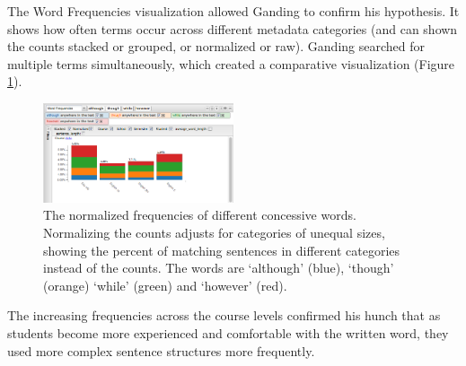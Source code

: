 \documentclass{sig-alternate}
\begin{document}
The Word Frequencies visualization allowed Ganding to confirm his hypothesis. It shows how often terms occur across different metadata categories (and can shown the counts stacked or grouped, or normalized or raw). Ganding searched for multiple terms simultaneously, which created a comparative visualization (Figure \ref{fig:rex05}).

\begin{figure}[h!]
\includegraphics[width=0.5\textwidth]{fig/rex/05.png}
\caption{The normalized frequencies of different concessive words. Normalizing the counts adjusts for categories of unequal sizes, showing the percent of matching sentences in different categories instead of the counts. The words are `although' (blue), `though' (orange) `while' (green) and `however' (red). \label{fig:rex05}}
\end{figure}

The increasing frequencies across the course levels confirmed his hunch that as students become more experienced and comfortable with the written word, they used more complex sentence structures more frequently. 
\end{document}

